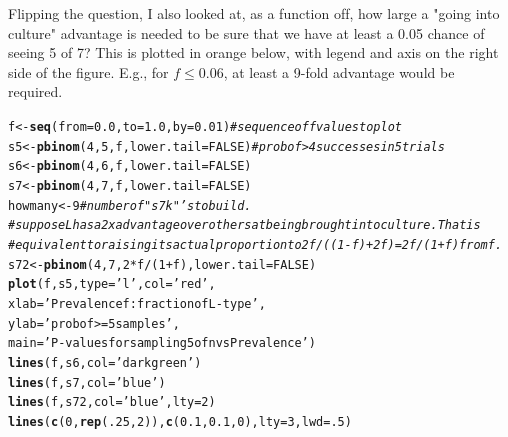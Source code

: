 \documentclass{article}\usepackage[]{graphicx}\usepackage[]{color}
\makeatletter
\newcommand{\hlnum}[1]{\textcolor[rgb]{0.686,0.059,0.569}{#1}}%
\newcommand{\hlstr}[1]{\textcolor[rgb]{0.192,0.494,0.8}{#1}}%
\newcommand{\hlcom}[1]{\textcolor[rgb]{0.678,0.584,0.686}{\textit{#1}}}%
\newcommand{\hlopt}[1]{\textcolor[rgb]{0,0,0}{#1}}%
\newcommand{\hlstd}[1]{\textcolor[rgb]{0.345,0.345,0.345}{#1}}%
\newcommand{\hlkwb}[1]{\textcolor[rgb]{0.69,0.353,0.396}{#1}}%
\newcommand{\hlkwc}[1]{\textcolor[rgb]{0.333,0.667,0.333}{#1}}%
\newcommand{\hlkwd}[1]{\textcolor[rgb]{0.737,0.353,0.396}{\textbf{#1}}}%
\newenvironment{kframe}{%
 \def\at@end@of@kframe{}%
 \ifinner\ifhmode%
  \def\at@end@of@kframe{\end{minipage}}%
  \begin{minipage}{\columnwidth}%
 \fi\fi%
 \def\FrameCommand##1{\hskip\@totalleftmargin \hskip-\fboxsep
 \colorbox{shadecolor}{##1}\hskip-\fboxsep
     \hskip-\linewidth \hskip-\@totalleftmargin \hskip\columnwidth}%
 \MakeFramed {\advance\hsize-\width
   \@totalleftmargin\z@ \linewidth\hsize
   \@setminipage}}%
 {\par\unskip\endMakeFramed%
 \at@end@of@kframe}
\newenvironment{knitrout}{}{} %
\makeatother
\begin{document}
Flipping the question, I also looked at, as a function of$ $f, how large a "going into culture"
advantage is needed to be sure that we have at least a 0.05 chance of seeing 5 of 7?  This is
plotted in orange below, with legend and axis on the right side of the figure.  E.g., for 
$f \le 0.06$, at least a 9-fold advantage would be required.

\begin{knitrout}\footnotesize
{}\color{fgcolor}\begin{kframe}
\begin{alltt}
\hlstd{f}  \hlkwb{<-} \hlkwd{seq}\hlstd{(}\hlkwc{from}\hlstd{=}\hlnum{0.0}\hlstd{,} \hlkwc{to}\hlstd{=}\hlnum{1.0}\hlstd{,} \hlkwc{by}\hlstd{=}\hlnum{0.01}\hlstd{)}     \hlcom{# sequence of f values to plot}
\hlstd{s5} \hlkwb{<-} \hlkwd{pbinom}\hlstd{(}\hlnum{4}\hlstd{,} \hlnum{5}\hlstd{, f,} \hlkwc{lower.tail}\hlstd{=}\hlnum{FALSE}\hlstd{)}  \hlcom{# prob of >4 successes in 5 trials}
\hlstd{s6} \hlkwb{<-} \hlkwd{pbinom}\hlstd{(}\hlnum{4}\hlstd{,} \hlnum{6}\hlstd{, f,} \hlkwc{lower.tail}\hlstd{=}\hlnum{FALSE}\hlstd{)}
\hlstd{s7} \hlkwb{<-} \hlkwd{pbinom}\hlstd{(}\hlnum{4}\hlstd{,} \hlnum{7}\hlstd{, f,} \hlkwc{lower.tail}\hlstd{=}\hlnum{FALSE}\hlstd{)}
\hlstd{howmany} \hlkwb{<-} \hlnum{9}                             \hlcom{# number of "s7k"'s to build. }
\hlcom{# suppose L has a 2x advantage over others at being brought into culture.  That is  }
\hlcom{# equivalent to raising its actual proportion to 2f/((1-f)+2f) = 2f/(1+f) from f.}
\hlstd{s72} \hlkwb{<-} \hlkwd{pbinom}\hlstd{(}\hlnum{4}\hlstd{,} \hlnum{7}\hlstd{,} \hlnum{2}\hlopt{*}\hlstd{f}\hlopt{/}\hlstd{(}\hlnum{1}\hlopt{+}\hlstd{f),} \hlkwc{lower.tail}\hlstd{=}\hlnum{FALSE}\hlstd{)}
\hlkwd{plot}\hlstd{(f, s5,} \hlkwc{type}\hlstd{=}\hlstr{'l'}\hlstd{,} \hlkwc{col}\hlstd{=}\hlstr{'red'}\hlstd{,}
     \hlkwc{xlab}\hlstd{=}\hlstr{'Prevalence f: fraction of L-type'}\hlstd{,}
     \hlkwc{ylab}\hlstd{=}\hlstr{'prob of >= 5 samples'}\hlstd{,}
     \hlkwc{main}\hlstd{=}\hlstr{'P-values for sampling 5 of n vs Prevalence'}\hlstd{)}
\hlkwd{lines}\hlstd{(f, s6,}  \hlkwc{col}\hlstd{=}\hlstr{'darkgreen'}\hlstd{)}
\hlkwd{lines}\hlstd{(f, s7,}  \hlkwc{col}\hlstd{=}\hlstr{'blue'}\hlstd{)}
\hlkwd{lines}\hlstd{(f, s72,} \hlkwc{col}\hlstd{=}\hlstr{'blue'}\hlstd{,}\hlkwc{lty}\hlstd{=}\hlnum{2}\hlstd{)}
\hlkwd{lines}\hlstd{(}\hlkwd{c}\hlstd{(}\hlnum{0}\hlstd{,}\hlkwd{rep}\hlstd{(}\hlnum{.25}\hlstd{,}\hlnum{2}\hlstd{)),} \hlkwd{c}\hlstd{(}\hlnum{0.1}\hlstd{,} \hlnum{0.1}\hlstd{,} \hlnum{0}\hlstd{),} \hlkwc{lty}\hlstd{=}\hlnum{3}\hlstd{,} \hlkwc{lwd}\hlstd{=}\hlnum{.5}\hlstd{)}

\end{alltt}
\end{kframe}
\end{knitrout}
\end{document}
